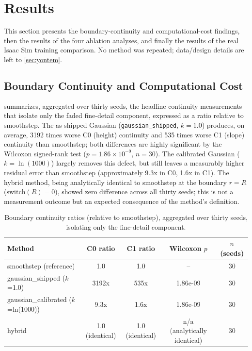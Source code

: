 \section{Results}
\label{sec:bulgular}

This section presents the boundary-continuity and computational-cost
findings, then the results of the four ablation analyses, and finally
the results of the real Isaac Sim training comparison. No method was
repeated; data/design details are left to \cref{sec:yontem}.

\subsection{Boundary Continuity and Computational Cost}
\label{sec:sureklilik}

 summarizes, aggregated over thirty seeds, the
headline continuity measurements that isolate only the faded fine-detail
component, expressed as a ratio relative to smoothstep. The as-shipped
Gaussian (\texttt{gaussian\_shipped}, $k=1.0$) produces, on average, 3192
times worse C0 (height) continuity and 535 times worse C1 (slope)
continuity than smoothstep; both differences are highly significant by
the Wilcoxon signed-rank test ($p=1.86\times10^{-9}$, $n=30$). The
calibrated Gaussian ($k=\ln(1000)$) largely removes this defect, but
still leaves a measurably higher residual error than smoothstep
(approximately 9.3x in C0, 1.6x in C1). The hybrid method, being
analytically identical to smoothstep at the boundary $r=R$
($\mathrm{switch}(R)=0$), showed zero difference across all thirty
seeds; this is not a measurement outcome but an expected consequence of
the method's definition.

\begin{table}[t]
\centering
\caption{Boundary continuity ratios (relative to smoothstep), aggregated
over thirty seeds, isolating only the fine-detail component.}
\label{tab:continuity}
\footnotesize
\begin{tabular}{@{}lccc c@{}}
\toprule
\textbf{Method} & \textbf{C0 ratio} & \textbf{C1 ratio} & \textbf{Wilcoxon $p$} & \textbf{$n$ (seeds)} \\
\midrule
smoothstep (reference) & 1.0 & 1.0 & -- & 30 \\
gaussian\_shipped ($k$=1.0) & 3192x & 535x & 1.86e-09 & 30 \\
gaussian\_calibrated ($k$=ln(1000)) & 9.3x & 1.6x & 1.86e-09 & 30 \\
hybrid & 1.0 (identical) & 1.0 (identical) & n/a (analytically identical) & 30 \\
\bottomrule
\end{tabular}
\end{table}

